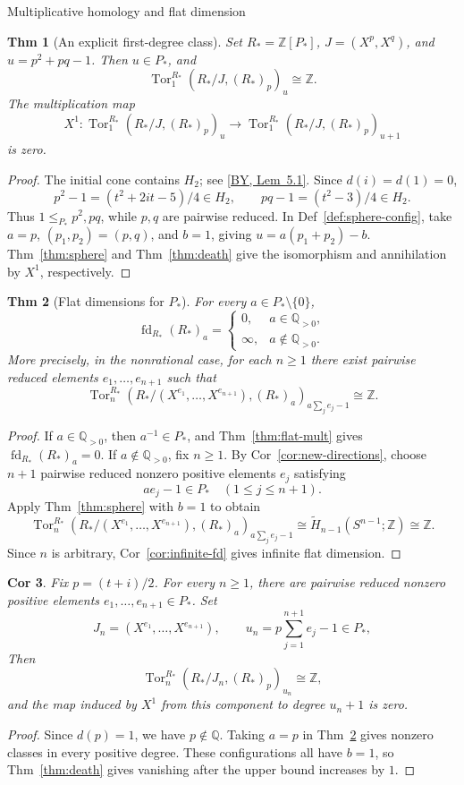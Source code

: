 \documentclass[10pt,letterpaper]{amsart}
\makeatletter
\numberwithin{equation}{section}
\newtheorem{thm}{Thm}[section]
\newtheorem{cor}[thm]{Cor}
\theoremstyle{definition}
\newcommand{\Z}{\mathbb Z}
\newcommand{\Q}{\mathbb Q}
\newcommand{\Tor}{\operatorname{Tor}}
\newcommand{\fd}{\operatorname{fd}}
\newcommand{\byref}[2]{\href{https://arxiv.org/pdf/2610.38300v1\#page=#1}{[BY, #2]}}
\def\subsection{\@startsection{subsection}{2}
  \z@{.9\linespacing\@plus.3\linespacing}{.4\linespacing}
  {\normalfont\fontsize{11.5}{14}\selectfont\bfseries\boldmath\raggedright}}
\makeatother
\begin{document}
\subsection{Multiplicative homology and flat dimension}
\begin{thm}[An explicit first-degree class]\label{thm:explicit-p}
Set $R_*=\Z[P_*]$, $J=(X^p,X^q)$, and $u=p^2+pq-1$. Then $u\in P_*$, and
\[
\Tor_1^{R_*}(R_*/J,(R_*)_p)_u\cong\Z.
\]
The multiplication map
\[
X^1:\Tor_1^{R_*}(R_*/J,(R_*)_p)_u
\longrightarrow\Tor_1^{R_*}(R_*/J,(R_*)_p)_{u+1}
\]
is zero.
\end{thm}
\begin{proof}
The initial cone contains $H_2$; see \byref{13}{Lem~5.1}. Since $d(i)=d(1)=0$,
\[
p^2-1=(t^2+2it-5)/4\in H_2,\qquad
pq-1=(t^2-3)/4\in H_2.
\]
Thus $1\le_{P_*}p^2,pq$, while $p,q$ are pairwise reduced. In Def~\ref{def:sphere-config}, take $a=p$, $(p_1,p_2)=(p,q)$, and $b=1$, giving $u=a(p_1+p_2)-b$. Thm~\ref{thm:sphere} and Thm~\ref{thm:death} give the isomorphism and annihilation by $X^1$, respectively.
\end{proof}

\begin{thm}[Flat dimensions for $P_*$]\label{thm:original-fd}
For every $a\in P_*\setminus\{0\}$,
\[
\fd_{R_*}(R_*)_a=
\begin{cases}
0,&a\in\Q_{>0},\\
\infty,&a\notin\Q_{>0}.
\end{cases}
\]
More precisely, in the nonrational case, for each $n\ge1$ there exist pairwise reduced elements $e_1,\ldots,e_{n+1}$ such that
\[
\Tor_n^{R_*}\!\left(R_* /(X^{e_1},\ldots,X^{e_{n+1}}),(R_*)_a\right)_{a\sum_j e_j-1}
\cong\Z.
\]
\end{thm}
\begin{proof}
If $a\in\Q_{>0}$, then $a^{-1}\in P_*$, and Thm~\ref{thm:flat-mult} gives $\fd_{R_*}(R_*)_a=0$.
If $a\notin\Q_{>0}$, fix $n\ge1$. By Cor~\ref{cor:new-directions}, choose $n+1$ pairwise reduced nonzero positive elements $e_j$ satisfying
\[
ae_j-1\in P_*\quad(1\le j\le n+1).
\]
Apply Thm~\ref{thm:sphere} with $b=1$ to obtain
\[
\Tor_n^{R_*}\!\left(R_* /(X^{e_1},\ldots,X^{e_{n+1}}),(R_*)_a\right)_{a\sum_j e_j-1}
\cong\widetilde H_{n-1}(S^{n-1};\Z)\cong\Z.
\]
Since $n$ is arbitrary, Cor~\ref{cor:infinite-fd} gives infinite flat dimension.
\end{proof}

\begin{cor}\label{cor:fixed-p-all}
Fix $p=(t+i)/2$. For every $n\ge1$, there are pairwise reduced nonzero positive elements $e_1,\ldots,e_{n+1}\in P_*$. Set
\[
J_n=(X^{e_1},\ldots,X^{e_{n+1}}),\qquad
u_n=p\sum_{j=1}^{n+1}e_j-1\in P_*,
\]
Then
\[
\Tor_n^{R_*}(R_*/J_n,(R_*)_p)_{u_n}\cong\Z,
\]
and the map induced by $X^1$ from this component to degree $u_n+1$ is zero.
\end{cor}
\begin{proof}
Since $d(p)=1$, we have $p\notin\Q$. Taking $a=p$ in Thm~\ref{thm:original-fd} gives nonzero classes in every positive degree. These configurations all have $b=1$, so Thm~\ref{thm:death} gives vanishing after the upper bound increases by $1$.
\end{proof}
\end{document}
